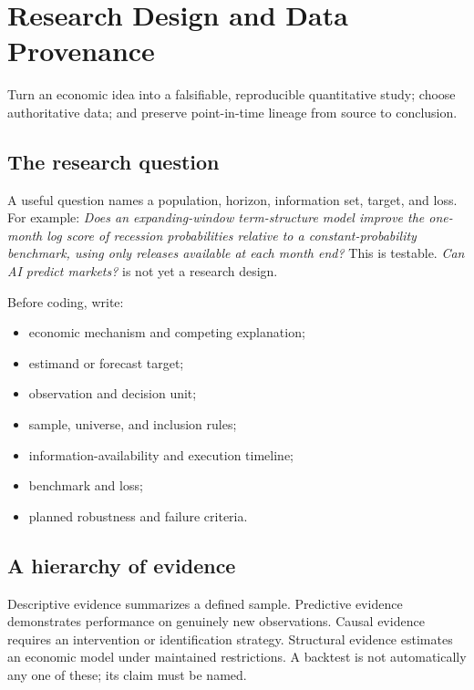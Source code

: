 \chapter{Research Design and Data Provenance}\label{ch:researchdesign}

\begin{objectives}
Turn an economic idea into a falsifiable, reproducible quantitative study; choose
authoritative data; and preserve point-in-time lineage from source to conclusion.
\end{objectives}

\section{The research question}

A useful question names a population, horizon, information set, target, and loss.
For example: \emph{Does an expanding-window term-structure model improve the
one-month log score of recession probabilities relative to a constant-probability
benchmark, using only releases available at each month end?} This is testable.
\emph{Can AI predict markets?} is not yet a research design.

Before coding, write:

\begin{itemize}
\item economic mechanism and competing explanation;
\item estimand or forecast target;
\item observation and decision unit;
\item sample, universe, and inclusion rules;
\item information-availability and execution timeline;
\item benchmark and loss;
\item planned robustness and failure criteria.
\end{itemize}

\section{A hierarchy of evidence}

Descriptive evidence summarizes a defined sample. Predictive evidence demonstrates
performance on genuinely new observations. Causal evidence requires an intervention
or identification strategy. Structural evidence estimates an economic model under
maintained restrictions. A backtest is not automatically any one of these; its claim
must be named.

